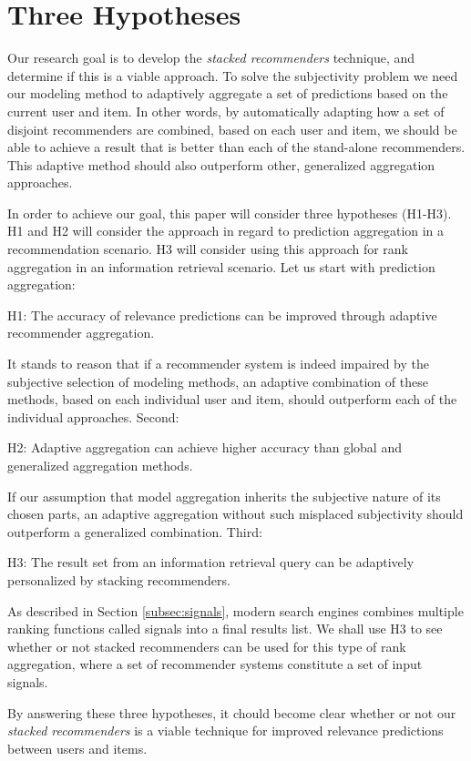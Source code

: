 \section{Three Hypotheses}
\label{sec:hypotheses}

Our research goal is to develop the \emph{stacked recommenders} technique, and determine if this is a viable approach.
To solve the subjectivity problem we need our modeling method
to adaptively aggregate a set of predictions based on the current user and item.
In other words, by automatically adapting how a set of disjoint recommenders
are combined, based on each user and item, we should be able to achieve a
result that is better than each of the stand-alone recommenders.
This adaptive method should also outperform other, generalized aggregation approaches.

In order to achieve our goal, this paper will consider three hypotheses (H1-H3).
H1 and H2 will consider the approach in regard to prediction aggregation
in a recommendation scenario. H3 will consider using this approach for
rank aggregation in an information retrieval scenario.
Let us start with prediction aggregation:

\begin{blockquote}
  H1: The accuracy of relevance predictions can be improved
  through adaptive recommender aggregation.
\end{blockquote}
%
It stands to reason that if a recommender system is indeed impaired
by the subjective selection of modeling methods,
an adaptive combination of these methods, based on each individual user and item, 
should outperform each of the individual approaches.
Second:

\begin{blockquote}
  H2: Adaptive aggregation can achieve higher accuracy than global and generalized aggregation methods.
\end{blockquote}
%
If our assumption that model aggregation inherits the subjective nature of its chosen parts,
an adaptive aggregation without such misplaced subjectivity should outperform a
generalized combination.
Third:

\begin{blockquote}
  H3: The result set from an information retrieval query
  can be adaptively personalized by stacking recommenders.
\end{blockquote}
%
As described in Section \ref{subsec:signals},
modern search engines combines multiple ranking functions called signals into a final results list.
We shall use H3 to see whether or not stacked recommenders can be used for this type of rank aggregation,
where a set of recommender systems constitute a set of input signals.

By answering these three hypotheses, it chould become clear whether or not
our \emph{stacked recommenders} is a viable technique for improved relevance predictions
between users and items.

